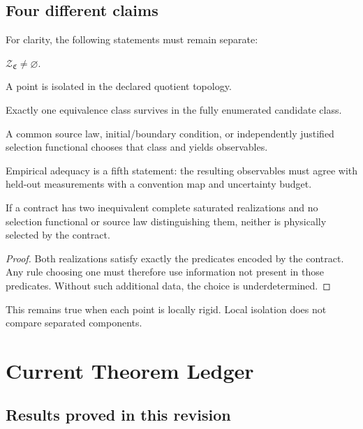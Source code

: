\documentclass[11pt]{article}
\newcommand{\Contract}{\mathfrak C}
\newcommand{\Sol}{\mathcal Z}
\begin{document}
\subsection{Four different claims}

For clarity, the following statements must remain separate:
\begin{description}[leftmargin=3.3cm,style=nextline]
\item[Existence.]
$\Sol_{\Contract}\ne\varnothing$.

\item[Local rigidity.]
A point is isolated in the declared quotient topology.

\item[Class-relative uniqueness.]
Exactly one equivalence class survives in the fully enumerated candidate
class.

\item[Physical selection.]
A common source law, initial/boundary condition, or independently justified
selection functional chooses that class and yields observables.
\end{description}

Empirical adequacy is a fifth statement: the resulting observables must agree
with held-out measurements with a convention map and uncertainty budget.

\begin{proposition}
If a contract has two inequivalent complete saturated realizations and no
selection functional or source law distinguishing them, neither is physically
selected by the contract.
\end{proposition}

\begin{proof}
Both realizations satisfy exactly the predicates encoded by the contract.
Any rule choosing one must therefore use information not present in those
predicates.  Without such additional data, the choice is underdetermined.
\end{proof}

This remains true when each point is locally rigid.  Local isolation does not
compare separated components.

\section{Current Theorem Ledger}

\subsection{Results proved in this revision}
\end{document}
